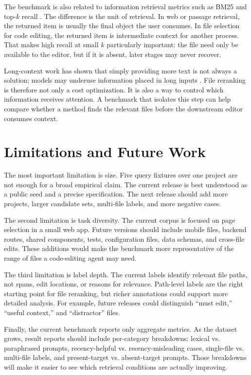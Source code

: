 \documentclass[11pt,a4paper]{article}
\begin{document}
The benchmark is also related to information retrieval metrics such as BM25 and
top-$k$ recall \cite{robertson2009probabilistic}. The difference is the unit of
retrieval. In web or passage retrieval, the returned item is usually the final
object the user consumes. In file selection for code editing, the returned item
is intermediate context for another process. That makes high recall at small
$k$ particularly important: the file need only be available to the editor, but
if it is absent, later stages may never recover.

Long-context work has shown that simply providing more text is not always a
solution; models may underuse information placed in long inputs
\cite{liu2024lost}. File reranking is therefore not only a cost optimization.
It is also a way to control which information receives attention. A benchmark
that isolates this step can help compare whether a method finds the relevant
files before the downstream editor consumes context.

\section{Limitations and Future Work}

The most important limitation is size. Five query fixtures over one project are
not enough for a broad empirical claim. The current release is best understood
as a public seed and a precise specification. The next release should add more
projects, larger candidate sets, multi-file labels, and more negative cases.

The second limitation is task diversity. The current corpus is focused on page
selection in a small web app. Future versions should include mobile files,
backend routes, shared components, tests, configuration files, data schemas, and
cross-file edits. These additions would make the benchmark more representative
of the range of files a code-editing agent may need.

The third limitation is label depth. The current labels identify relevant file
paths, not spans, edit locations, or reasons for relevance. Path-level labels
are the right starting point for file reranking, but richer annotations could
support more detailed analysis. For example, future releases could distinguish
``must edit,'' ``useful context,'' and ``distractor'' files.

Finally, the current benchmark reports only aggregate metrics. As the dataset
grows, result reports should include per-category breakdowns: lexical vs.
paraphrased prompts, recency-helpful vs. recency-misleading cases, single-file
vs. multi-file labels, and present-target vs. absent-target prompts. Those
breakdowns will make it easier to see which retrieval conditions are actually
improving.
\end{document}
